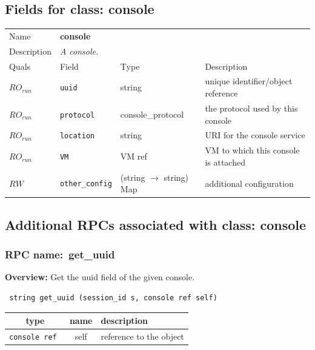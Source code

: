 \subsection{Fields for class: console}
\begin{longtable}{|lllp{}|}
\hline
\multicolumn{1}{|l}{Name} & \multicolumn{3}{l|}{\bf console} \\
\multicolumn{1}{|l}{Description} & \multicolumn{3}{l|}{\parbox{11cm}{\em A
console.}} \\
\hline
Quals & Field & Type & Description \\
\hline
$\mathit{RO}_\mathit{run}$ &  {\tt uuid} & string & unique identifier/object reference \\
$\mathit{RO}_\mathit{run}$ &  {\tt protocol} & console\_protocol & the protocol used by this console \\
$\mathit{RO}_\mathit{run}$ &  {\tt location} & string & URI for the console service \\
$\mathit{RO}_\mathit{run}$ &  {\tt VM} & VM ref & VM to which this console is attached \\
$\mathit{RW}$ &  {\tt other\_config} & (string $\rightarrow$ string) Map & additional configuration \\
\hline
\end{longtable}
\subsection{Additional RPCs associated with class: console}
\subsubsection{RPC name:~get\_uuid}

{\bf Overview:} 
Get the uuid field of the given console.

\begin{verbatim} string get_uuid (session_id s, console ref self)\end{verbatim}



 
\vspace{0.3cm}
\begin{tabular}{|c|c|p{7cm}|}
 \hline
{\bf type} & {\bf name} & {\bf description} \\ \hline
{\tt console ref } & self & reference to the object \\ \hline 

\end{tabular}

